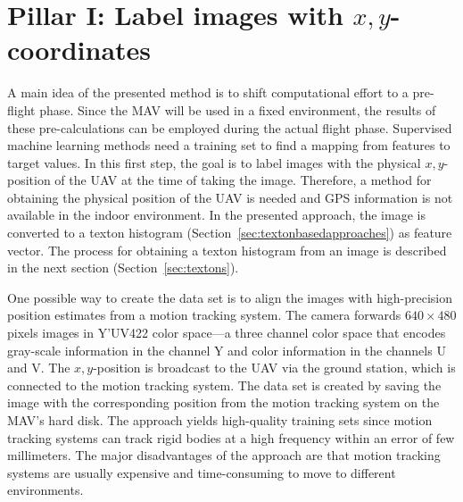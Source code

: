\documentclass{report}
\begin{document}
\section{Pillar I: Label images with $x,y$-coordinates}
\label{sec:mapping}



A main idea of the presented method is to shift computational effort
to a pre-flight phase. Since the MAV will be used in a fixed
environment, the results of these pre-calculations can be employed
during the actual flight phase. Supervised machine learning methods
need a training set to find a mapping from features to target
values. In this first step, the goal is to label images with the
physical $x,y$-position of the UAV at the time of taking the
image. Therefore, a method for obtaining the physical position of the
UAV is needed and GPS information is not available in the indoor
environment. In the presented approach, the image is converted to a
texton histogram (Section~\ref{sec:textonbasedapproaches}) as feature
vector. The process for obtaining a texton histogram from an image is
described in the next section (Section~\ref{sec:textons}).

One possible way to create the data set is to align the images with
high-precision position estimates from a motion tracking system.  The
camera forwards $640 \times 480$ pixels images in Y'UV422 color
space---a three channel color space that encodes gray-scale
information in the channel Y and color information in the channels U
and V.
The $x,y$-position is broadcast to the UAV via the ground station,
which is connected to the motion tracking system.  The data set is
created by saving the image with the corresponding position from the
motion tracking system on the MAV's hard disk.  The approach yields
high-quality training sets since motion tracking systems can track
rigid bodies at a high frequency within an error of few
millimeters. The major disadvantages of the approach are that motion
tracking systems are usually expensive and time-consuming to move to
different environments.
\end{document}
